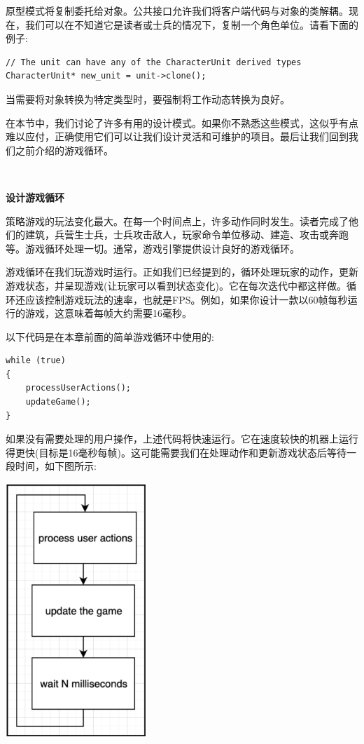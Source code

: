 原型模式将复制委托给对象。公共接口允许我们将客户端代码与对象的类解耦。现在，我们可以在不知道它是读者或士兵的情况下，复制一个角色单位。请看下面的例子: \par

\begin{lstlisting}[caption={}]
// The unit can have any of the CharacterUnit derived types
CharacterUnit* new_unit = unit->clone();
\end{lstlisting}

当需要将对象转换为特定类型时，要强制将工作动态转换为良好。 \par
在本节中，我们讨论了许多有用的设计模式。如果你不熟悉这些模式，这似乎有点难以应付，正确使用它们可以让我们设计灵活和可维护的项目。最后让我们回到我们之前介绍的游戏循环。 \par

\noindent\textbf{}\ \par
\textbf{设计游戏循环} \ \par
策略游戏的玩法变化最大。在每一个时间点上，许多动作同时发生。读者完成了他们的建筑，兵营生士兵，士兵攻击敌人，玩家命令单位移动、建造、攻击或奔跑等。游戏循环处理一切。通常，游戏引擎提供设计良好的游戏循环。 \par
游戏循环在我们玩游戏时运行。正如我们已经提到的，循环处理玩家的动作，更新游戏状态，并呈现游戏(让玩家可以看到状态变化)。它在每次迭代中都这样做。循环还应该控制游戏玩法的速率，也就是FPS。例如，如果你设计一款以60帧每秒运行的游戏，这意味着每帧大约需要16毫秒。 \par
以下代码是在本章前面的简单游戏循环中使用的: \par

\begin{lstlisting}[caption={}]
while (true)
{
	processUserActions();
	updateGame();
}
\end{lstlisting}

如果没有需要处理的用户操作，上述代码将快速运行。它在速度较快的机器上运行得更快(目标是16毫秒每帧)。这可能需要我们在处理动作和更新游戏状态后等待一段时间，如下图所示: \par

\begin{center}
	\includegraphics[width=0.4\textwidth]{content/Section-2/Chapter-11/12}
\end{center}

